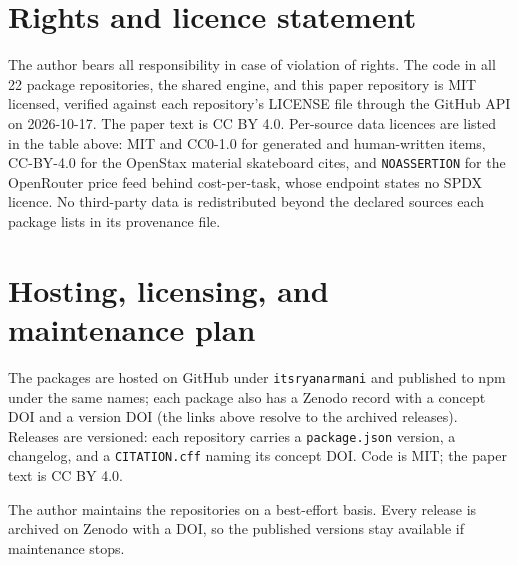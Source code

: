 \documentclass[twoside,11pt]{article}
\begin{document}
\begin{itemize}\small

\end{itemize}

\section{Rights and licence statement}
The author bears all responsibility in case of violation of rights. The
code in all 22 package repositories, the shared engine, and this paper
repository is MIT licensed, verified against each repository's LICENSE
file through the GitHub API on 2026-10-17. The paper text is CC BY 4.0.
Per-source data licences are listed in the table above: MIT and CC0-1.0
for generated and human-written items, CC-BY-4.0 for the OpenStax
material skateboard cites, and \texttt{NOASSERTION} for the OpenRouter
price feed behind cost-per-task, whose endpoint states no SPDX licence.
No third-party data is redistributed beyond the declared sources each
package lists in its provenance file.

\section{Hosting, licensing, and maintenance plan}
The packages are hosted on GitHub under \texttt{itsryanarmani} and published
to npm under the same names; each package also has a Zenodo record with a
concept DOI and a version DOI (the links above resolve to the archived
releases). Releases are versioned: each repository carries a
\texttt{package.json} version, a changelog, and a \texttt{CITATION.cff}
naming its concept DOI. Code is MIT; the paper text is CC BY 4.0.

\noindent The author maintains the repositories on a best-effort basis. Every release is
archived on Zenodo with a DOI, so the published versions stay available if
maintenance stops.
\end{document}
